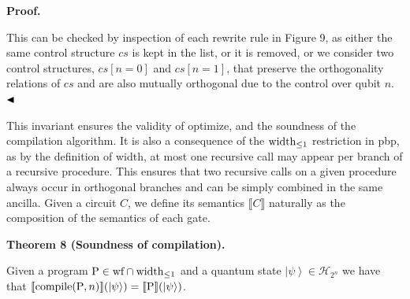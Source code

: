  
 
 
\par\medskip\noindent\textbf{Proof.}\par
 
 
This can be checked by inspection of each rewrite rule in Figure 9, as either the same control structure $cs$ is kept in the list, or it is removed, or we consider two control structures, $cs[n=0]$ and $cs[n=1]$, that preserve the orthogonality relations of $cs$ and are also mutually orthogonal due to the control over qubit $n$. $\hfill\blacktriangleleft$\par
 
 
 
This invariant ensures the validity of optimize, and the soundness of the compilation algorithm. It is also a consequence of the $\textnormal{{width}}_{\leq 1}$ restriction in pbp, as by the definition of width, at most one recursive call may appear per branch of a recursive procedure. This ensures that two recursive calls on a given procedure always occur in orthogonal branches and can be simply combined in the same ancilla. Given a circuit $C$, we define its semantics $\llbracket C\rrbracket$ naturally as the composition of the semantics of each gate.\par
 
 
 
\par\medskip\noindent\textbf{Theorem 8 (Soundness of compilation).}\par
 
 
Given a program $\mathrm{P}\in\textnormal{{wf}}\cap\textnormal{{width}}_{\leq 1}$ and a quantum state $\left|\psi\right\rangle\in\mathcal{H}_{2^{n}}$ we have that $\llbracket\textnormal{{compile}}{}(\mathrm{P},n)\rrbracket(\left|\psi\right%
\rangle)=\llbracket\mathrm{P}\rrbracket(\left|\psi\right\rangle)$.\par
 
 
 
 
